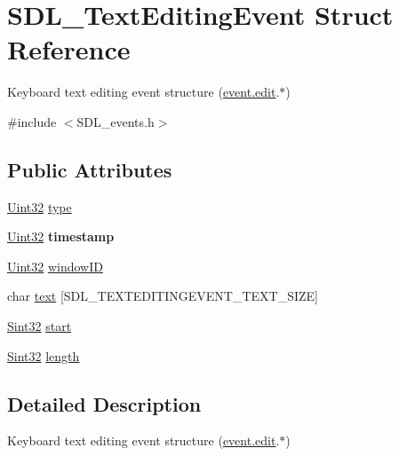 \hypertarget{structSDL__TextEditingEvent}{}\section{S\+D\+L\+\_\+\+Text\+Editing\+Event Struct Reference}
\label{structSDL__TextEditingEvent}


Keyboard text editing event structure (\hyperlink{unionSDL__Event_a9a7e3b67b2654d4c5fc509676c6a7183}{event.\+edit}.$\ast$)  




{\ttfamily \#include $<$S\+D\+L\+\_\+events.\+h$>$}

\subsection*{Public Attributes}
\begin{DoxyCompactItemize}
\item 
\hyperlink{SDL__stdinc_8h_add440eff171ea5f55cb00c4a9ab8672d}{Uint32} \hyperlink{structSDL__TextEditingEvent_a198e6df194a3bf12cf5f82553e84c7cb}{type}
\item 
\hypertarget{structSDL__TextEditingEvent_afc164f40abee6fd8e72e01b589210c75}{}\hyperlink{SDL__stdinc_8h_add440eff171ea5f55cb00c4a9ab8672d}{Uint32} {\bfseries timestamp}\label{structSDL__TextEditingEvent_afc164f40abee6fd8e72e01b589210c75}

\item 
\hyperlink{SDL__stdinc_8h_add440eff171ea5f55cb00c4a9ab8672d}{Uint32} \hyperlink{structSDL__TextEditingEvent_a23b3e414cf7a7ccc547b7595ca930049}{window\+I\+D}
\item 
char \hyperlink{structSDL__TextEditingEvent_a29848c2e7819ea98ae8fb08543e6d420}{text} \mbox{[}S\+D\+L\+\_\+\+T\+E\+X\+T\+E\+D\+I\+T\+I\+N\+G\+E\+V\+E\+N\+T\+\_\+\+T\+E\+X\+T\+\_\+\+S\+I\+Z\+E\mbox{]}
\item 
\hyperlink{SDL__stdinc_8h_a7a90b941db9d4582e9ad7abb9940ff7e}{Sint32} \hyperlink{structSDL__TextEditingEvent_ac6c6a00835d92b12c0ba5b78b5ad676d}{start}
\item 
\hyperlink{SDL__stdinc_8h_a7a90b941db9d4582e9ad7abb9940ff7e}{Sint32} \hyperlink{structSDL__TextEditingEvent_adca95505c0bf212834930df58f6d1aa5}{length}
\end{DoxyCompactItemize}


\subsection{Detailed Description}
Keyboard text editing event structure (\hyperlink{unionSDL__Event_a9a7e3b67b2654d4c5fc509676c6a7183}{event.\+edit}.$\ast$) 

